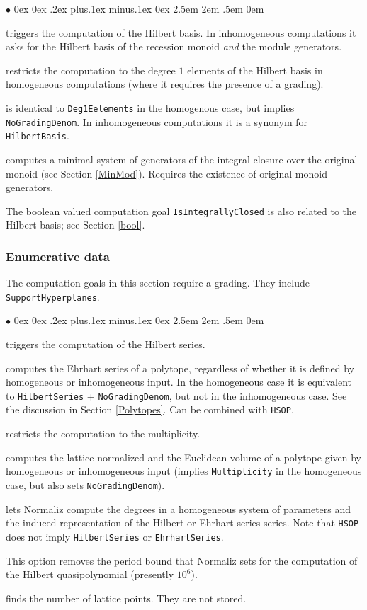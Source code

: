 \documentclass[12pt,a4paper]{scrartcl}
\newcommand{\stdli}{ \topsep0ex \partopsep0ex %
\parsep.2ex plus.1ex minus.1ex \itemsep0ex%
\leftmargin2.5em \labelwidth2em \labelsep.5em \rightmargin0em}%
\renewenvironment{itemize}{\begin{list}{{$\bullet$}}{\stdli}}{\end{list}}
\theoremstyle{definition}
\def\itemtt[#1]{\item[\textbf{\ttt{#1}}]}
\def\ttt{\texttt}
\begin{document}
\begin{itemize}
	
	\itemtt[HilbertBasis, -N] triggers the computation of the Hilbert basis. In inhomogeneous computations it asks for the Hilbert basis of the recession monoid \emph{and} the module generators.
	
	\itemtt[Deg1Elements, -1] restricts the computation to the degree $1$ elements of the Hilbert basis in homogeneous computations (where it requires the presence of a grading). 
	
	\itemtt[LatticePoints] is identical to \verb|Deg1Eelements| in the homogenous case, but implies \verb|NoGradingDenom|. In inhomogeneous computations it is a synonym for \verb|HilbertBasis|.
	
	\itemtt[ModuleGeneratorsOverOriginalMonoid, -M] computes a minimal system of generators of the integral closure over the original monoid (see Section \ref{MinMod}). Requires the existence of original monoid generators.
\end{itemize}

The boolean valued computation goal \verb|IsIntegrallyClosed| is also related to the Hilbert basis; see Section \ref{bool}.

\subsubsection{Enumerative data}

The computation goals in this section require a grading. They include \verb|SupportHyperplanes|.

\begin{itemize}
	\itemtt [HilbertSeries,-q] triggers the computation of the Hilbert series.
	
	\itemtt[EhrhartSeries] computes the Ehrhart series of a polytope, regardless of whether it is defined by homogeneous or inhomogeneous input. In the homogeneous case it is equivalent to \verb|HilbertSeries| + \verb|NoGradingDenom|, but not in the inhomogeneous case. See the discussion in Section \ref{Polytopes}. Can be combined with \verb|HSOP|.
	
	\itemtt[Multiplicity, -v] restricts the computation to the multiplicity.
	
	\itemtt[Volume, -V] computes the lattice normalized and the Euclidean volume of a polytope given by homogeneous or inhomogeneous input (implies \verb|Multiplicity| in the homogeneous case, but also sets \verb|NoGradingDenom|). 
	
	\itemtt[HSOP] lets Normaliz compute the degrees in a homogeneous system of parameters and the induced representation of the Hilbert or Ehrhart series  series. Note that \ttt{HSOP} does not imply \ttt{HilbertSeries} or \ttt{EhrhartSeries}.
	
	\itemtt[NoPeriodBound] This option removes the period bound that Normaliz sets for the computation of the Hilbert quasipolynomial (presently $10^6$).
	
	\itemtt[NumberLatticePoints] finds the number of lattice points. They are not stored.
\end{itemize}
\end{document}
